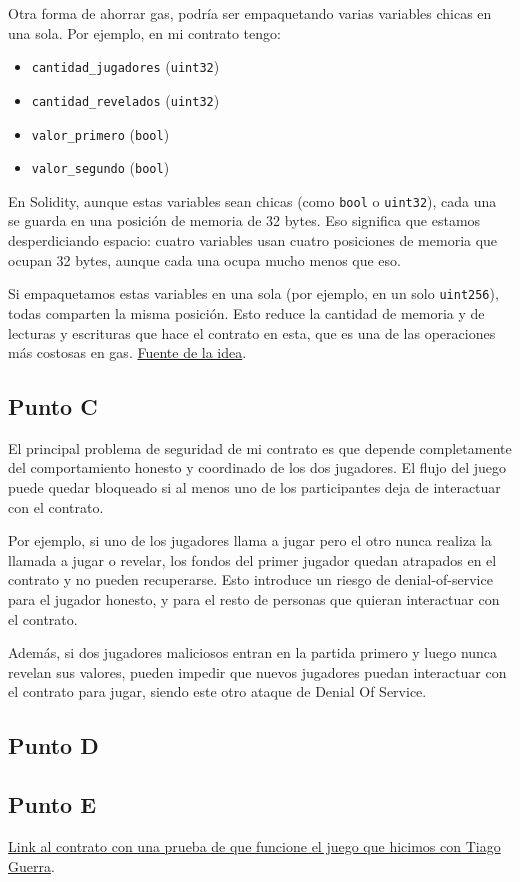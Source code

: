 \documentclass[12pt]{article}
\begin{document}
Otra forma de ahorrar gas, podría ser empaquetando varias variables chicas en una sola.  
Por ejemplo, en mi contrato tengo:
\begin{itemize}
    \item \texttt{cantidad\_jugadores} (\texttt{uint32})
    \item \texttt{cantidad\_revelados} (\texttt{uint32})
    \item \texttt{valor\_primero} (\texttt{bool})
    \item \texttt{valor\_segundo} (\texttt{bool})
\end{itemize}

En Solidity, aunque estas variables sean chicas (como \texttt{bool} o \texttt{uint32}), 
cada una se guarda en una posición de memoria de 32 bytes.  
Eso significa que estamos desperdiciando espacio: cuatro variables usan cuatro posiciones de memoria que ocupan 32 bytes, 
aunque cada una ocupa mucho menos que eso.

Si empaquetamos estas variables en una sola (por ejemplo, en un solo \texttt{uint256}), 
todas comparten la misma posición.  
Esto reduce la cantidad de memoria y de lecturas y escrituras que hace el contrato en esta, 
que es una de las operaciones más costosas en gas. \href{https://rareskills.io/post/gas-optimization}{Fuente de la idea}.

\subsection*{Punto C}
El principal problema de seguridad de mi contrato es que depende completamente del comportamiento honesto y coordinado de los dos jugadores. El flujo del juego puede quedar bloqueado si al menos uno de los participantes deja de interactuar con el contrato.

Por ejemplo, si uno de los jugadores llama a jugar pero el otro nunca realiza la llamada a jugar o revelar, los fondos del primer jugador quedan atrapados en el contrato y no pueden recuperarse. Esto introduce un riesgo de denial-of-service para el jugador honesto, y para el resto de personas que quieran interactuar con el contrato. 

Además, si dos jugadores maliciosos entran en la partida primero y luego nunca revelan sus valores, pueden impedir que nuevos jugadores puedan interactuar con el contrato para jugar, siendo este otro ataque de Denial Of Service. 

\subsection*{Punto D}

\subsection*{Punto E}
\href{https://sepolia.etherscan.io/address/0x52ad35083f7be6a2d0a96dff34a7940694ec223f}{Link al contrato con una prueba de que funcione el juego que hicimos con Tiago Guerra}.
\end{document}
